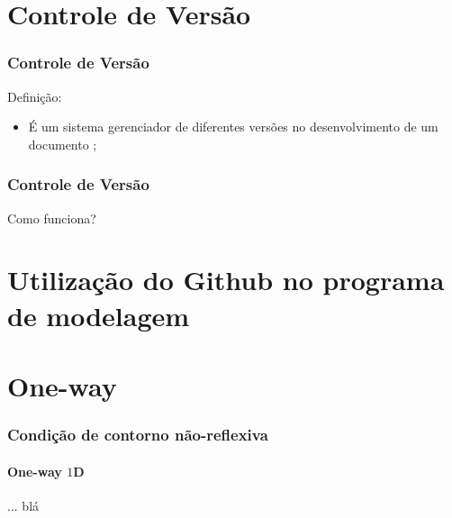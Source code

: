 \documentclass[10pt]{beamer} %
\begin{document}
\section{Controle de Versão}

\begin{frame}
	\frametitle{Controle de Versão}
	\transboxin%
	\begin{block}{Definição:}
		\begin{itemize}
			\pause
			\item É um sistema gerenciador de diferentes versões no desenvolvimento de um documento ;
			\pause %
		\end{itemize}	
	\end{block}
	
\end{frame}


\begin{frame}
	\frametitle{Controle de Versão}
	\transboxin%
	\begin{block}{Como funciona?}
    
	\end{block}
	
\end{frame}


\section{Utilização do Github no programa de modelagem}


\section{One-way}


\begin{frame}
	\frametitle{Condição de contorno não-reflexiva}
	\framesubtitle{One-way $1$D}
	\begin{block}{...}
		blá
	\end{block}		
\end{frame}
\end{document}
